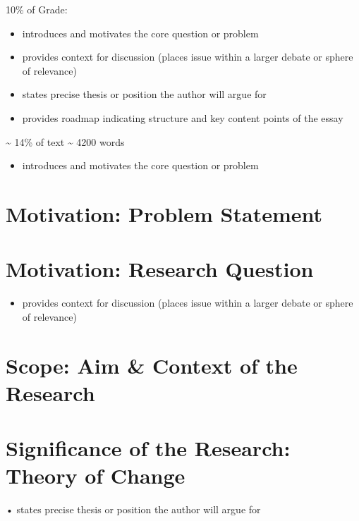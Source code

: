 \documentclass[
  letterpaper,
]{book}
\providecommand{\tightlist}{%
  \setlength{\itemsep}{0pt}\setlength{\parskip}{0pt}}
\begin{document}
10\% of Grade:

\begin{itemize}
\tightlist
\item
  introduces and motivates the core question or problem
\item
  provides context for discussion (places issue within a larger debate
  or sphere of relevance)
\item
  states precise thesis or position the author will argue for
\item
  provides roadmap indicating structure and key content points of the
  essay
\end{itemize}

\textasciitilde{} 14\% of text \textasciitilde{} 4200 words

\begin{itemize}
\tightlist
\item
  introduces and motivates the core question or problem
\end{itemize}

\section{Motivation: Problem
Statement}\label{motivation-problem-statement}

\section{Motivation: Research
Question}\label{motivation-research-question}

\begin{itemize}
\tightlist
\item
  provides context for discussion (places issue within a larger debate
  or sphere of relevance)
\end{itemize}

\section{Scope: Aim \& Context of the
Research}\label{scope-aim-context-of-the-research}

\section{Significance of the Research: Theory of
Change}\label{significance-of-the-research-theory-of-change}

• states precise thesis or position the author will argue for
\end{document}
